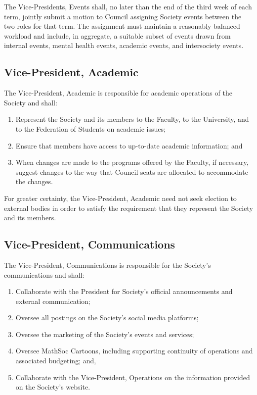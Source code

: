 The Vice-Presidents, Events shall, no later than the end of the third week of
each term, jointly submit a motion to Council assigning Society events between
the two roles for that term. The assignment must maintain a reasonably balanced
workload and include, in aggregate, a suitable subset of events drawn from
internal events, mental health events, academic events, and intersociety events.

\subsection{Vice-President, Academic}
The Vice-President, Academic is responsible for academic operations of the
Society and shall:
\begin{enumerate}
    \item Represent the Society and its members to the Faculty, to the University,
        and to the Federation of Students on academic issues;
    \item Ensure that members have access to up-to-date academic information; and
    \item When changes are made to the programs offered by the Faculty, if
        necessary, suggest changes to the way that Council seats are allocated to
        accommodate the changes.
\end{enumerate}

For greater certainty, the Vice-President, Academic need not seek election to
external bodies in order to satisfy the requirement that they represent the
Society and its members.

\subsection{Vice-President, Communications}
The Vice-President, Communications is responsible for the Society's 
communications and shall:
\begin{enumerate}
        \item Collaborate with the President for Society's official announcements and external
        communication;
        \item Oversee all postings on the Society's social media platforms;
        \item Oversee the marketing of the Society's events and services;
        \item Oversee MathSoc Cartoons, including supporting continuity of operations and
                associated budgeting; and,
        \item Collaborate with the Vice-President, Operations on the information 
                provided on the Society's website.
\end{enumerate}

